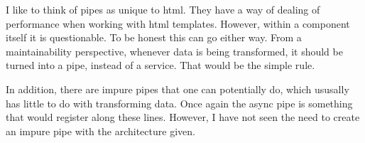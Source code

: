 I like to think of pipes as unique to html. They have a way of dealing of performance when working with html templates. However, within a component itself it is questionable. To be honest this can go either way. From a maintainability perspective, whenever data is being transformed, it should be turned into a pipe, instead of a service. That would be the simple rule.

In addition, there are impure pipes that one can potentially do, which ususally has little to do with transforming data. Once again the async pipe is something that would register along these lines. However, I have not seen the need to create an impure pipe with the architecture given. 
